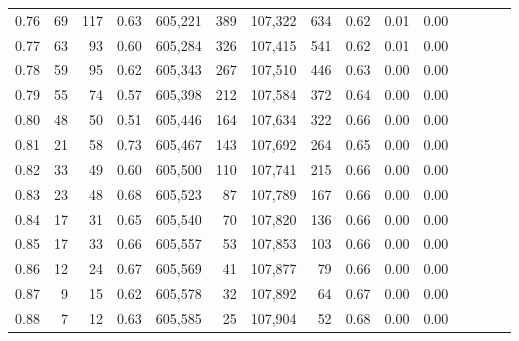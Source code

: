 \begin{tabular}{rrrcrrrrrrrrrrr}
0.76 &      69 &    117 &                                       0.63 &  605,221 &      389 &  107,322 &      634 &  0.62 &  0.01 &                         0.00 \\
0.77 &      63 &     93 &                                       0.60 &  605,284 &      326 &  107,415 &      541 &  0.62 &  0.01 &                         0.00 \\
0.78 &      59 &     95 &                                       0.62 &  605,343 &      267 &  107,510 &      446 &  0.63 &  0.00 &                         0.00 \\
0.79 &      55 &     74 &                                       0.57 &  605,398 &      212 &  107,584 &      372 &  0.64 &  0.00 &                         0.00 \\
0.80 &      48 &     50 &                                       0.51 &  605,446 &      164 &  107,634 &      322 &  0.66 &  0.00 &                         0.00 \\
0.81 &      21 &     58 &                                       0.73 &  605,467 &      143 &  107,692 &      264 &  0.65 &  0.00 &                         0.00 \\
0.82 &      33 &     49 &                                       0.60 &  605,500 &      110 &  107,741 &      215 &  0.66 &  0.00 &                         0.00 \\
0.83 &      23 &     48 &                                       0.68 &  605,523 &       87 &  107,789 &      167 &  0.66 &  0.00 &                         0.00 \\
0.84 &      17 &     31 &                                       0.65 &  605,540 &       70 &  107,820 &      136 &  0.66 &  0.00 &                         0.00 \\
0.85 &      17 &     33 &                                       0.66 &  605,557 &       53 &  107,853 &      103 &  0.66 &  0.00 &                         0.00 \\
0.86 &      12 &     24 &                                       0.67 &  605,569 &       41 &  107,877 &       79 &  0.66 &  0.00 &                         0.00 \\
0.87 &       9 &     15 &                                       0.62 &  605,578 &       32 &  107,892 &       64 &  0.67 &  0.00 &                         0.00 \\
0.88 &       7 &     12 &                                       0.63 &  605,585 &       25 &  107,904 &       52 &  0.68 &  0.00 &                         0.00 \\

\end{tabular}
